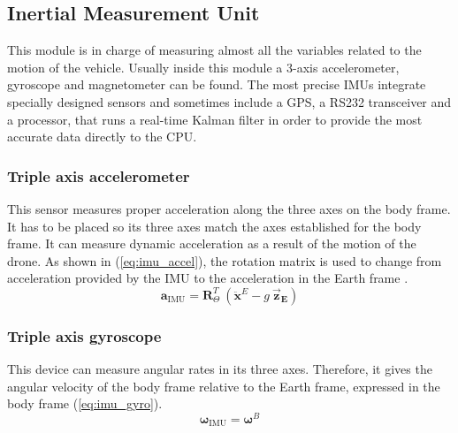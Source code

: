 \documentclass[journal]{IEEEtran}
\newcommand*{\subb}[1]{_{\mathrm{#1}}}
\begin{document}
	\subsection{Inertial Measurement Unit}
	This module is in charge of measuring almost all the variables related to the motion of the vehicle. Usually inside this module  a 3-axis accelerometer, gyroscope and magnetometer can be found. The most precise IMUs integrate specially designed sensors and sometimes include a GPS, a RS232 transceiver and a processor, that runs a real-time Kalman filter in order to provide the most accurate data directly to the CPU. \\
	
	
	\subsubsection{Triple axis accelerometer} This sensor measures proper acceleration along the three axes on the body frame. It has to be placed so its three axes match the axes established for the body frame. It can measure dynamic acceleration as a result of the motion of the drone.  As shown in (\ref{eq:imu_accel}), the rotation matrix is used to change from acceleration provided by the IMU to the acceleration in the Earth frame \cite{modelling_control_mahony}.\\
	\begin{equation} \label{eq:imu_accel}
	\bm{a}\subb{IMU}= \bm{R}^T_\Theta \ (\bm{\ddot{x}}^E - g \ \bm{\vec{z}_E})
	\end{equation}
	
	\subsubsection{Triple axis gyroscope} This device can measure angular rates in its three axes. Therefore, it  gives the angular velocity of the body frame relative to the Earth frame, expressed in the body frame (\ref{eq:imu_gyro}).\\
	\begin{equation} \label{eq:imu_gyro}
	\bm{\omega}\subb{IMU}= \bm{\omega}^B 
	\end{equation}
	
\end{document}
